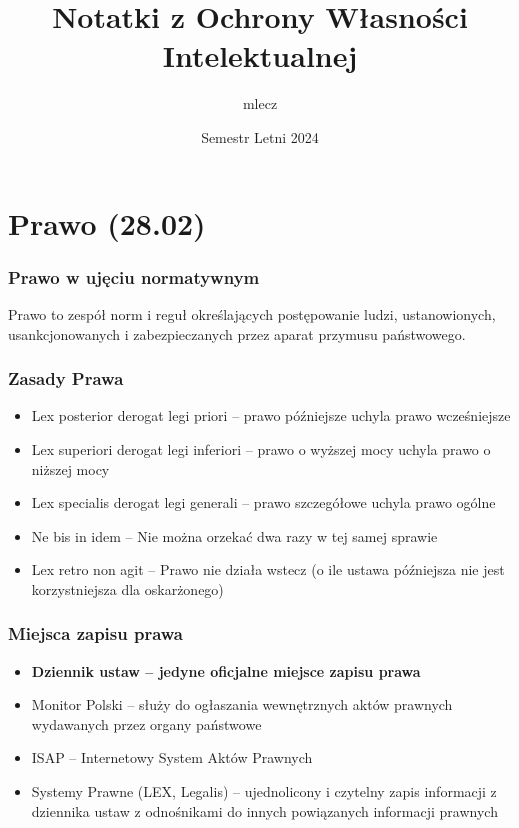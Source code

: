 \message{ !name(owi.tex)}\documentclass{article}
\title{Notatki z Ochrony Własności Intelektualnej}
\author{mlecz}
\date{Semestr Letni 2024}
\begin{document}

\maketitle

\tableofcontents

\section{Prawo (28.02)}

\subsubsection{Prawo w ujęciu normatywnym}
Prawo to zespół norm i reguł określających postępowanie ludzi, ustanowionych, usankcjonowanych i zabezpieczanych przez aparat przymusu państwowego.

\subsubsection{Zasady Prawa}
\begin{itemize}
  \item Lex posterior derogat legi priori -- prawo późniejsze uchyla prawo wcześniejsze
  \item Lex superiori derogat legi inferiori -- prawo o wyższej mocy uchyla prawo o niższej mocy
  \item Lex specialis derogat legi generali -- prawo szczegółowe uchyla prawo ogólne
  \item Ne bis in idem -- Nie można orzekać dwa razy w tej samej sprawie
  \item Lex retro non agit -- Prawo nie działa wstecz (o ile ustawa późniejsza nie jest
        korzystniejsza dla oskarżonego)
\end{itemize}

\subsubsection{Miejsca zapisu prawa}
\begin{itemize}
  \item \textbf{Dziennik ustaw -- jedyne oficjalne miejsce zapisu prawa}
  \item Monitor Polski -- służy do ogłaszania wewnętrznych aktów prawnych wydawanych
        przez organy państwowe
  \item ISAP -- Internetowy System Aktów Prawnych
  \item Systemy Prawne (LEX, Legalis) -- ujednolicony i czytelny zapis informacji
        z dziennika ustaw z odnośnikami do innych powiązanych informacji prawnych
\end{itemize}
\end{document}
